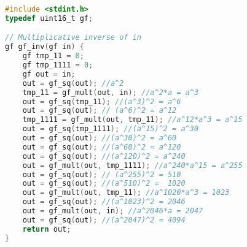\documentclass[brazil, english]{ufsc-thesis}
\begin{document}
\begin{lstlisting}[caption={Inversion of an element in $\mathbb{F}_{2^{12}}$},label={lst:mult-inv},language=C]
#include <stdint.h>
typedef uint16_t gf;

// Multiplicative inverse of in
gf gf_inv(gf in) {
    gf tmp_11 = 0;
    gf tmp_1111 = 0;
    gf out = in;
    out = gf_sq(out); //a^2
    tmp_11 = gf_mult(out, in); //a^2*a = a^3
    out = gf_sq(tmp_11); //(a^3)^2 = a^6
    out = gf_sq(out); // (a^6)^2 = a^12
    tmp_1111 = gf_mult(out, tmp_11); //a^12*a^3 = a^15
    out = gf_sq(tmp_1111); //(a^15)^2 = a^30
    out = gf_sq(out); //(a^30)^2 = a^60
    out = gf_sq(out); //(a^60)^2 = a^120
    out = gf_sq(out); //(a^120)^2 = a^240
    out = gf_mult(out, tmp_1111); //a^240*a^15 = a^255
    out = gf_sq(out); // (a^255)^2 = 510
    out = gf_sq(out); //(a^510)^2 =  1020
    out = gf_mult(out, tmp_11); //a^1020*a^3 = 1023
    out = gf_sq(out); //(a^1023)^2 = 2046
    out = gf_mult(out, in); //a^2046*a = 2047
    out = gf_sq(out); //(a^2047)^2 = 4094
    return out;
}
\end{lstlisting}
\end{document}
